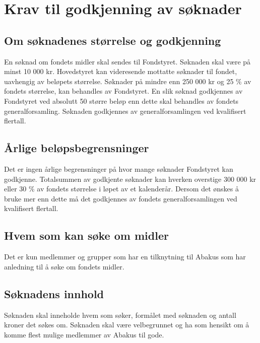 \section{Krav til godkjenning av søknader}
\subsection{Om søknadenes størrelse og godkjenning}
En søknad om fondets midler skal sendes til Fondstyret. Søknaden skal være
på minst 10 000 kr. Hovedstyret kan videresende mottatte søknader til fondet,
uavhengig av beløpets størrelse. Søknader på mindre enn 250 000 kr og 25 \% av
fondets størrelse, kan behandles av Fondstyret. En slik søknad godkjennes av
Fondstyret ved absolutt 50%
større beløp enn dette skal behandles av fondets generalforsamling. Søknaden
godkjennes av generalforsamlingen ved kvalifisert flertall.

\subsection{Årlige beløpsbegrensninger}
Det er ingen årlige begrensninger på hvor mange søknader Fondstyret kan
godkjenne. Totalsummen av godkjente søknader kan hverken overstige 300 000 kr
eller 30 \% av fondets størrelse i løpet av et kalenderår. Dersom det ønskes å
bruke mer enn dette må det godkjennes av fondets generalforsamlingen ved
kvalifisert flertall.

\subsection{Hvem som kan søke om midler}
Det er kun medlemmer og  grupper som har en tilknytning til Abakus som har
anledning til å søke om fondets midler.

\subsection{Søknadens innhold}
Søknaden skal inneholde hvem som søker, formålet med søknaden og antall kroner
det søkes om. Søknaden skal være velbegrunnet og ha som hensikt om å komme
flest mulige medlemmer av Abakus til gode.
